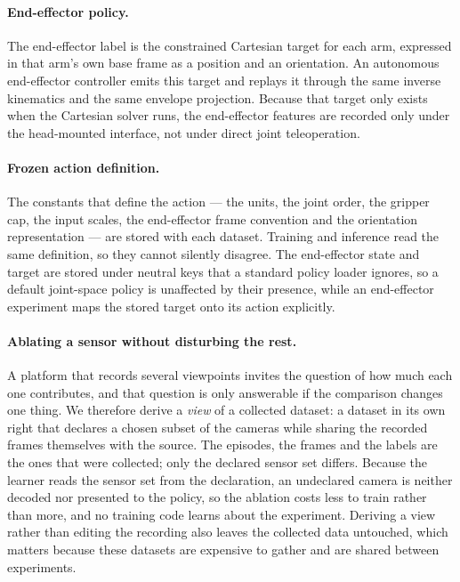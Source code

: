 \paragraph{End-effector policy.} The end-effector label is the constrained
Cartesian target for each arm, expressed in that arm's own base frame as a
position and an orientation. An autonomous end-effector controller emits
this target and replays it through the same inverse kinematics and the same
envelope projection. Because that target only exists when the Cartesian
solver runs, the end-effector features are recorded only under the
head-mounted interface, not under direct joint teleoperation.

\paragraph{Frozen action definition.} The constants that define the action
--- the units, the joint order, the gripper cap, the input scales, the
end-effector frame convention and the orientation representation --- are
stored with each dataset. Training and inference read the same definition,
so they cannot silently disagree. The end-effector state and target are
stored under neutral keys that a standard policy loader ignores, so a
default joint-space policy is unaffected by their presence, while an
end-effector experiment maps the stored target onto its action explicitly.

\paragraph{Ablating a sensor without disturbing the rest.} A platform that
records several viewpoints invites the question of how much each one
contributes, and that question is only answerable if the comparison changes
one thing. We therefore derive a \emph{view} of a collected dataset: a
dataset in its own right that declares a chosen subset of the cameras while
sharing the recorded frames themselves with the source. The episodes, the
frames and the labels are the ones that were collected; only the declared
sensor set differs. Because the learner reads the sensor set from the
declaration, an undeclared camera is neither decoded nor presented to the
policy, so the ablation costs less to train rather than more, and no
training code learns about the experiment. Deriving a view rather than
editing the recording also leaves the collected data untouched, which
matters because these datasets are expensive to gather and are shared
between experiments.

